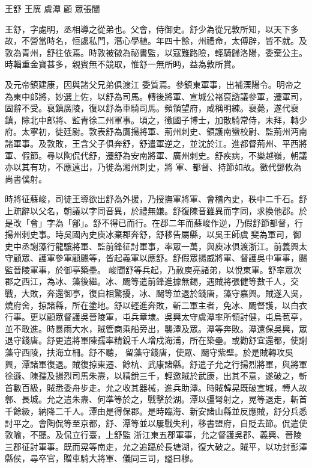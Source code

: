 
\begin{pinyinscope}
王舒
 王廙
 虞潭
 顧
 眾張闓



 王舒，字處明，丞相導之從弟也。父會，侍御史。舒少為從兄敦所知，以天下多故，不營當時名，恒處私門，潛心學植。年四十餘，州禮命，太傅辟，皆不就。及敦為青州，舒往依焉。時敦被徵為祕書監，以寇難路險，輕騎歸洛陽，委棄公主。時輜重金寶甚多，親賓無不競取，惟舒一無所眄，益為敦所賞。



 及元帝鎮建康，因與諸父兄弟俱渡江
 委質焉。參鎮東軍事，出補溧陽令。明帝之為東中郎將，妙選上佐，以舒為司馬。轉後將軍、宣城公褚裒諮議參軍，遷軍司，固辭不受。裒鎮廣陵，復以舒為車騎司馬。頻領望府，咸稱明練。裒薨，遂代裒鎮，除北中郎將、監青徐二州軍事。頃之，徵國子博士，加散騎常侍，未拜，轉少府。太寧初，徙廷尉。敦表舒為鷹揚將軍、荊州刺史、領護南蠻校尉、監荊州沔南諸軍事。及敦敗，王含父子俱奔舒，舒遣軍逆之，並沈於江。進都督荊州、平西將軍、假節。尋以陶侃代舒，遷舒為安南將軍、廣州刺史。舒疾病，不樂越嶺，朝議亦以其有功，不應遠出，乃徙為湘州刺史，將
 軍、都督、持節如故。徵代鄧攸為尚書僕射。



 時將征蘇峻，司徒王導欲出舒為外援，乃授撫軍將軍、會稽內史，秩中二千石。舒上疏辭以父名，朝議以字同音異，於禮無嫌。舒復陳音雖異而字同，求換他郡。於是改「會」字為「鄶」。舒不得已而行。在郡二年而蘇峻作逆，乃假舒節都督，行揚州刺史事。時吳國內史庾冰棄郡奔舒，舒移告屬縣，以吳王師虞斐為軍司，御史中丞謝藻行龍驤將軍、監前鋒征討軍事，率眾一萬，與庾冰俱渡浙江。前義興太守顧眾、護軍參軍顧颺等，皆起義軍以應舒。舒假眾揚威將軍、督護吳中軍事，颺監晉陵軍事，於御亭築壘。
 峻聞舒等兵起，乃赦庾亮諸弟，以悅東軍。舒率眾次郡之西江，為冰、藻後繼。冰、颺等遣前鋒進據無錫，遇賊將張健等數千人，交戰，大敗，奔還御亭，復自相驚擾，冰、颺等並退於錢唐，藻守嘉興。賊遂入吳，燒府舍，掠諸縣，所在塗地。舒以輕進奔敗，斬二軍主者，免冰、颺督護，以白衣行事。更以顧眾督護吳晉陵軍，屯兵章埭。吳興太守虞潭率所領討健，屯烏苞亭，並不敢進。時暴雨大水，賊管商乘船旁出，襲潭及眾。潭等奔敗。潭還保吳興，眾退守錢唐。舒更遣將軍陳孺率精銳千人增戍海浦，所在築壘。或勸舒宜還都，使謝藻守西陵，扶海立柵。舒不聽，
 留藻守錢唐，使眾、颺守紫壁。於是賊轉攻吳興，潭諸軍復退。賊復掠東遷、餘杭、武康諸縣。舒遣子允之行揚烈將軍，與將軍徐遜、陳孺及揚烈司馬朱燾，以精銳三千，輕邀賊於武康，出其不意，遂破之，斬首數百級，賊悉委舟步走。允之收其器械，進兵助潭。時賊韓晃既破宣城，轉人故鄣、長城。允之遣朱燾、何準等於之，戰擊於湖。潭以彊弩射之，晃等退走，斬首千餘級，納降二千人。潭由是得保郡。是時臨海、新安諸山縣並反應賊，舒分兵悉討平之。會陶侃等至京都，舒、潭等並以屢戰失利，移書盟府，自貶去節。侃遣使敦喻，不聽。及侃立行臺，上舒監
 浙江東五郡軍事，允之督護吳郡、義興、晉陵三郡征討軍事。既而晃等南走，允之追躡於長塘湖，復大破之。賊平，以功封彭澤縣侯，尋卒官，贈車騎大將軍、儀同三司，謚曰穆。




\end{pinyinscope}
